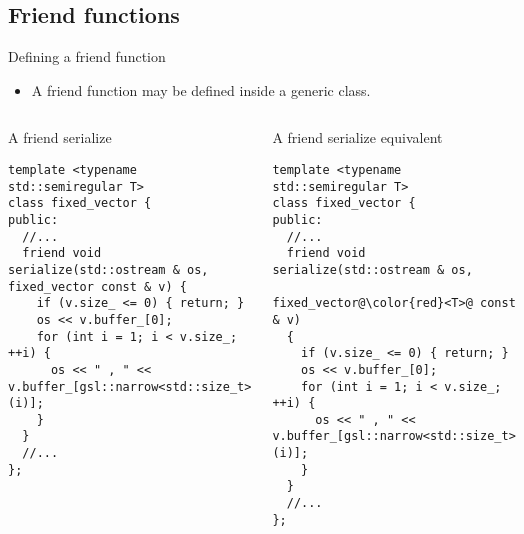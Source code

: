 \subsection{Friend functions}

\begin{frame}[t,fragile,shrink=18]{Defining a friend function}
\begin{itemize}
  \item A friend function may be defined inside a generic class.
\end{itemize}

\begin{columns}[T]


\begin{block}{A friend serialize}
\begin{lstlisting}
template <typename std::semiregular T>
class fixed_vector {
public:
  //...
  friend void serialize(std::ostream & os, fixed_vector const & v) {
    if (v.size_ <= 0) { return; }
    os << v.buffer_[0];
    for (int i = 1; i < v.size_; ++i) {
      os << " , " << v.buffer_[gsl::narrow<std::size_t>(i)];
    }
  }
  //...  
};
\end{lstlisting}
\end{block}

\pause
{}
\begin{block}{A friend serialize equivalent}
\begin{lstlisting}[escapechar=@]
template <typename std::semiregular T>
class fixed_vector {
public:
  //...
  friend void serialize(std::ostream & os, 
                        fixed_vector@\color{red}<T>@ const & v) 
  {
    if (v.size_ <= 0) { return; }
    os << v.buffer_[0];
    for (int i = 1; i < v.size_; ++i) {
      os << " , " << v.buffer_[gsl::narrow<std::size_t>(i)];
    }
  }
  //...  
};
\end{lstlisting}
\end{block}

\end{columns}

\end{frame}


